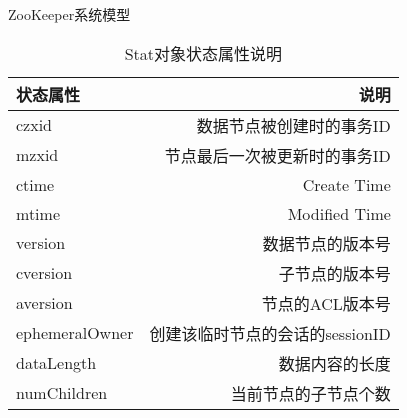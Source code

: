 \documentclass[10pt]{beamer}
\begin{document}
\begin{frame}[fragile]{ZooKeeper系统模型}
  \begin{table}
    \caption{Stat对象状态属性说明}\center
    \begin{tabular}{lr}
      \toprule
      状态属性 & 说明\\
      \midrule
      czxid & 数据节点被创建时的事务ID\\
      mzxid & 节点最后一次被更新时的事务ID\\
      ctime & Create Time\\
      mtime & Modified Time\\
      version & 数据节点的版本号\\
      cversion & 子节点的版本号\\
      aversion & 节点的ACL版本号\\
      ephemeralOwner & 创建该临时节点的会话的sessionID\\
      dataLength & 数据内容的长度\\
      numChildren & 当前节点的子节点个数\\

      \bottomrule
    \end{tabular}
  \end{table}
\end{frame}
\end{document}
